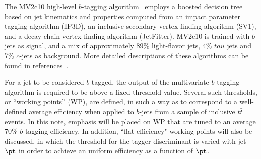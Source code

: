 The MV2c10 high-level $b$-tagging algorithm~\cite{ATL-PHYS-PUB-2016-012} employs a boosted decision tree based on jet kinematics and properties computed from an impact parameter tagging algorithm (IP3D), an inclusive secondary vertex finding algorithm (SV1),  and a decay chain vertex finding algorithm (JetFitter). MV2c10 is trained with $b$-jets as signal, and a mix of approximately 89\% light-flavor jets, 4\% $tau$ jets and 7\% $c$-jets as background. More detailed descriptions of these algorithms can be found in references~\cite{ref:btagPaper,ATL-PHYS-PUB-2015-022,ATL-PHYS-PUB-2016-012}.

For a jet to be considered $b$-tagged, the output of the multivariate $b$-tagging algorithm is required to be above a fixed threshold value. Several such thresholds, or ``working points'' (WP), are defined, in such a way as to correspond to a well-defined average efficiency when applied to $b$-jets from a sample of inclusive $t\bar{t}$ events. In this note, emphasis will be placed on WP that are tuned to an average 70\% $b$-tagging efficiency. In addition, ``flat efficiency" working points will also be discussed, in which the threshold for the tagger discriminant is varied with jet $\pt$ in order to achieve an uniform efficiency as a function of $\pt$.


